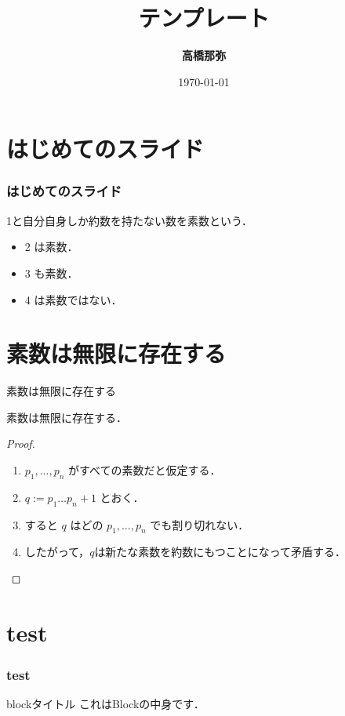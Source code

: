 \documentclass[dvipdfmx, 11pt]{beamer}
\title{テンプレート}
\author{\textbf{高橋那弥}}
\institute{文殊の知恵}
\date{\today}
\begin{document}
\maketitle
\frame{\tableofcontents[hideallsubsections]}
\section{はじめてのスライド}
\begin{frame}
  \frametitle{はじめてのスライド}
  \begin{definition}
    1と自分自身しか約数を持たない数を\alert{素数}という．
  \end{definition}
  \begin{example}
    \begin{itemize}
      \item 2 は素数．
      \pause
      \item 3 も素数．
      \pause
      \item 4 は素数ではない．
    \end{itemize}
  \end{example}
\end{frame}
\section{素数は無限に存在する}
\begin{frame}{素数は無限に存在する}
  \begin{theorem}
  素数は無限に存在する．
  \end{theorem}
  \begin{proof}
    \begin{enumerate}
      \item<1-> $p_1, \dots, p_n$ がすべての素数だと仮定する．
      \item<2-> $q:=p_1\dots p_n + 1$ とおく．
      \item<3-> すると $q$ はどの $p_1,\dots,p_n$ でも割り切れない．
      \item<1-> したがって，$q$は新たな素数を約数にもつことになって矛盾する．\qedhere
    \end{enumerate}
  \end{proof}
\end{frame}
\section{test}
\begin{frame}
  \frametitle{test}
  \begin{block}{blockタイトル}
    これはBlockの中身です．
  \end{block}
\end{frame}
\end{document}
